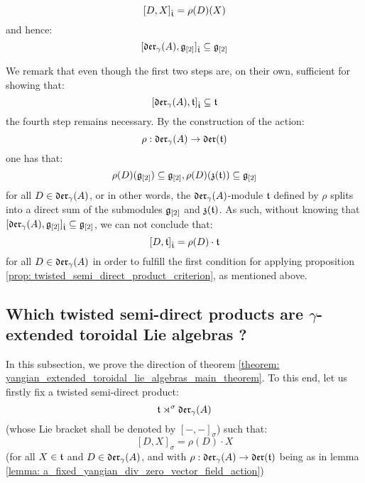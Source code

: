 \begin{itemize}
\begin{enumerate}
                    $$[D, X]_{\hat{\mathfrak{t}}} = \rho(D)(X)$$
                and hence:
                    $$[\mathfrak{der}_{\gamma}(A), \mathfrak{g}_{[2]}]_{\hat{\mathfrak{t}}} \subseteq \mathfrak{g}_{[2]}$$
            \end{enumerate}
            We remark that even though the first two steps are, on their own, sufficient for showing that:
                $$[\mathfrak{der}_{\gamma}(A), \mathfrak{t}]_{\hat{\mathfrak{t}}} \subseteq \mathfrak{t}$$
            the fourth step remains necessary. By the construction of the action:
                $$\rho: \mathfrak{der}_{\gamma}(A) \to \mathfrak{der}(\mathfrak{t})$$
            one has that:
                $$\rho(D)(\mathfrak{g}_{[2]}) \subseteq \mathfrak{g}_{[2]}, \rho(D)(\mathfrak{z}(\mathfrak{t})) \subseteq \mathfrak{g}_{[2]}$$
            for all $D \in \mathfrak{der}_{\gamma}(A)$, or in other words, the $\mathfrak{der}_{\gamma}(A)$-module $\mathfrak{t}$ defined by $\rho$ splits into a direct sum of the submodules $\mathfrak{g}_{[2]}$ and $\mathfrak{z}(\mathfrak{t})$. As such, without knowing that $[\mathfrak{der}_{\gamma}(A), \mathfrak{g}_{[2]}]_{\hat{\mathfrak{t}}} \subseteq \mathfrak{g}_{[2]}$, we can not conclude that:
                $$[D, \mathfrak{t}]_{\hat{\mathfrak{t}}} = \rho(D) \cdot \mathfrak{t}$$
            for all $D \in \mathfrak{der}_{\gamma}(A)$ in order to fulfill the first condition for applying proposition \ref{prop: twisted_semi_direct_product_criterion}, as mentioned above.
        \end{itemize}

    \subsection{Which twisted semi-direct products are \texorpdfstring{$\gamma$}{}-extended toroidal Lie algebras ?} \label{subsection: which_twisted_semi_direct_products_are_yangian_extended_toroidal_lie_algebras}
    
        In this subsection, we prove the  direction of theorem \ref{theorem: yangian_extended_toroidal_lie_algebras_main_theorem}. To this end, let us firstly fix a twisted semi-direct product:
            $$\mathfrak{t} \rtimes^{\sigma} \mathfrak{der}_{\gamma}(A)$$
        (whose Lie bracket shall be denoted by $[-, -]_{\sigma}$) such that:
            $$[D, X]_{\sigma} = \rho(D) \cdot X$$
        (for all $X \in \mathfrak{t}$ and $D \in \mathfrak{der}_{\gamma}(A)$, and with $\rho: \mathfrak{der}_{\gamma}(A) \to \mathfrak{der}(\mathfrak{t})$ being as in lemma \ref{lemma: a_fixed_yangian_div_zero_vector_field_action})

